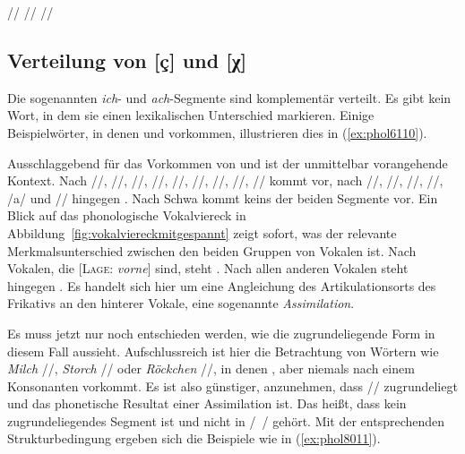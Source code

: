\begin{exe}
  \ex\label{ex:phol013} \begin{xlist}
  	\ex // \phopro \textipa{[ve:g]}
  	\ex // \phopro \textipa{[h\o:l@]} 
  	\ex // \phopro \textipa{[Po:f@n]}
  \end{xlist}
\end{exe}

\subsection{Verteilung von [ç] und [χ]}

\label{sec:verteilungvonichach}

Die sogenannten \textit{ich}- und \textit{ach}-Segmente sind komplementär verteilt.
Es gibt kein Wort, in dem sie einen lexikalischen Unterschied markieren.
Einige Beispielwörter, in denen \textipa{[\c{c}]} und \textipa{[X]} vorkommen, illustrieren dies in (\ref{ex:phol6110}).

\begin{exe}
  \ex\label{ex:phol6110}
  \begin{xlist}
  \end{xlist}
\end{exe}

Ausschlaggebend für das Vorkommen von \textipa{[\c{c}]} und \textipa{[X]} ist der unmittelbar vorangehende Kontext.
Nach //, //, //, //, //, //, //, /\textipa{\o}/, /\textipa{\oe}/ kommt \textipa{[\c{c}]} vor, nach //, //, //, //, /a/ und // hingegen \textipa{[X]}.
Nach Schwa kommt keins der beiden Segmente vor.
Ein Blick auf das phonologische Vokalviereck in Abbildung~\ref{fig:vokalviereckmitgespannt} zeigt sofort, was der relevante Merkmalsunterschied zwischen den beiden Gruppen von Vokalen ist.
Nach Vokalen, die [\textsc{Lage}: \textit{vorne}] sind, steht \textipa{[\c{c}]}.
Nach allen anderen Vokalen steht hingegen \textipa{[X]}.
Es handelt sich hier um eine Angleichung des Artikulationsorts des Frikativs an den hinterer Vokale, eine sogenannte \textit{Assimilation}.

Es muss jetzt nur noch entschieden werden, wie die zugrundeliegende Form in diesem Fall aussieht.
Aufschlussreich ist hier die Betrachtung von Wörtern wie \textit{Milch} //, \textit{Storch} // oder \textit{Röckchen} //, in denen \textipa{[\c{c}]}, aber niemals \textipa{[X]} nach einem Konsonanten vorkommt.
Es ist also günstiger, anzunehmen, dass // zugrundeliegt und \textipa{[X]} das phonetische Resultat einer Assimilation ist.
Das heißt, dass \textipa{[X]} kein zugrundeliegendes Segment ist und nicht in /~/ gehört.
Mit der entsprechenden Strukturbedingung ergeben sich die Beispiele wie in (\ref{ex:phol8011}).

